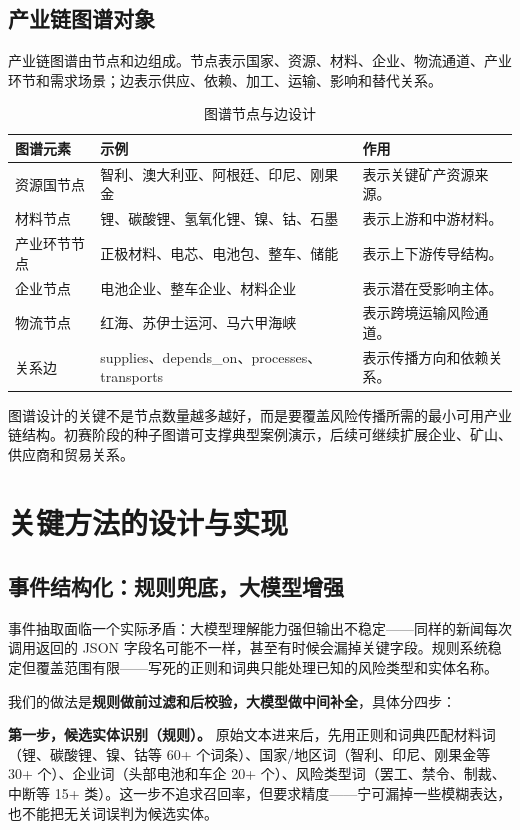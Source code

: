 \documentclass[12pt,a4paper]{ctexart}
\begin{document}
\subsection{产业链图谱对象}

产业链图谱由节点和边组成。节点表示国家、资源、材料、企业、物流通道、产业环节和需求场景；边表示供应、依赖、加工、运输、影响和替代关系。

\begin{table}[htbp]
\centering
\caption{图谱节点与边设计}
\begin{tabularx}{\textwidth}{p{2.6cm}p{4.6cm}X}
\toprule
图谱元素 & 示例 & 作用 \\
\midrule
资源国节点 & 智利、澳大利亚、阿根廷、印尼、刚果金 & 表示关键矿产资源来源。 \\
材料节点 & 锂、碳酸锂、氢氧化锂、镍、钴、石墨 & 表示上游和中游材料。 \\
产业环节节点 & 正极材料、电芯、电池包、整车、储能 & 表示上下游传导结构。 \\
企业节点 & 电池企业、整车企业、材料企业 & 表示潜在受影响主体。 \\
物流节点 & 红海、苏伊士运河、马六甲海峡 & 表示跨境运输风险通道。 \\
关系边 & supplies、depends\_on、processes、transports & 表示传播方向和依赖关系。 \\
\bottomrule
\end{tabularx}
\end{table}

图谱设计的关键不是节点数量越多越好，而是要覆盖风险传播所需的最小可用产业链结构。初赛阶段的种子图谱可支撑典型案例演示，后续可继续扩展企业、矿山、供应商和贸易关系。

\section{关键方法的设计与实现}

\subsection{事件结构化：规则兜底，大模型增强}

事件抽取面临一个实际矛盾：大模型理解能力强但输出不稳定——同样的新闻每次调用返回的 JSON 字段名可能不一样，甚至有时候会漏掉关键字段。规则系统稳定但覆盖范围有限——写死的正则和词典只能处理已知的风险类型和实体名称。

我们的做法是\textbf{规则做前过滤和后校验，大模型做中间补全}，具体分四步：

\textbf{第一步，候选实体识别（规则）。} 原始文本进来后，先用正则和词典匹配材料词（锂、碳酸锂、镍、钴等 60+ 个词条）、国家/地区词（智利、印尼、刚果金等 30+ 个）、企业词（头部电池和车企 20+ 个）、风险类型词（罢工、禁令、制裁、中断等 15+ 类）。这一步不追求召回率，但要求精度——宁可漏掉一些模糊表达，也不能把无关词误判为候选实体。
\end{document}
